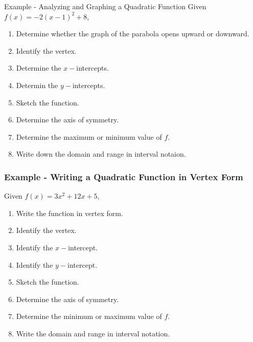 \documentclass{beamer}
\begin{document}
\begin{frame}{Example - Analyzing and Graphing a Quadratic Function}
Given \(f(x)=-2(x-1)^2+8\),
\begin{enumerate}
    \item Determine whether the graph of the parabola opens upward or downward. \pause
    \item Identify the vertex. \pause 
    \item Determine the \(x-\)intercepts. \pause 
    \item Determin the \(y-\)intercepts. \pause
    \item Sketch the function. \pause
    \item Determine the axis of symmetry. \pause  
    \item Determine the maximum or minimum value of \(f\).\pause
    \item Write down the domain and range in interval notaion. 
\end{enumerate} 

    
\end{frame}

\begin{frame}
    \frametitle{Example - Writing a Quadratic Function in Vertex Form}

    Given \(f(x)=3x^2 +12x+5\),

    \begin{enumerate}
        \item Write the function in vertex form. \pause
        \item Identify the vertex. \pause
        \item Identify the \(x-\)intercept.\pause
        \item Identify the \(y-\)intercept. \pause
        \item Sketch the function.\pause
        \item Determine the axis of symmetry. \pause
        \item Determine the minimum or maximum value of \(f\). \pause
        \item Write the domain and range in interval notation. 
    \end{enumerate}

\end{frame}
\end{document}
